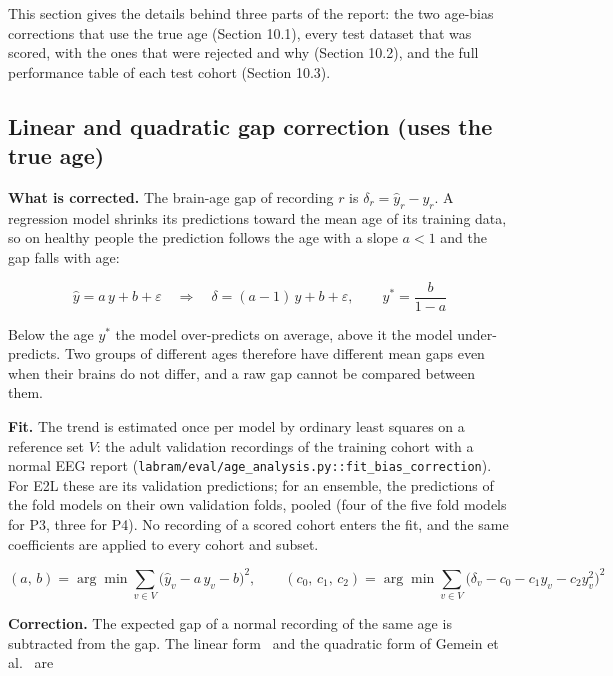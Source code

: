 \documentclass[11pt,a4paper]{article}
\begin{document}
This section gives the details behind three parts of the report: the two age-bias corrections that use the true age (Section 10.1), every test dataset that was scored, with the ones that were rejected and why (Section 10.2), and the full performance table of each test cohort (Section 10.3).

\subsection{Linear and quadratic gap correction (uses the true age)}

\textbf{What is corrected.} The brain-age gap of recording $r$ is $\delta_r = \hat y_r - y_r$. A regression model shrinks its predictions toward the mean age of its training data, so on healthy people the prediction follows the age with a slope $a < 1$ and the gap falls with age:

\begin{equation}
\hat y = a\,y + b + \varepsilon \quad \Rightarrow \quad \delta = (a - 1)\,y + b + \varepsilon, \qquad y^{*} = \frac{b}{1 - a} \tag{29}
\end{equation}

Below the age $y^{*}$ the model over-predicts on average, above it the model under-predicts. Two groups of different ages therefore have different mean gaps even when their brains do not differ, and a raw gap cannot be compared between them.

\textbf{Fit.} The trend is estimated once per model by ordinary least squares on a reference set $V$: the adult validation recordings of the training cohort with a normal EEG report (\texttt{labram/eval/age\_analysis.py::fit\_bias\_correction}). For E2L these are its validation predictions; for an ensemble, the predictions of the fold models on their own validation folds, pooled (four of the five fold models for P3, three for P4). No recording of a scored cohort enters the fit, and the same coefficients are applied to every cohort and subset.

\begin{equation}
(a,\,b) = \arg\min \sum_{v \in V} \big( \hat y_v - a\,y_v - b \big)^2, \qquad (c_0,\,c_1,\,c_2) = \arg\min \sum_{v \in V} \big( \delta_v - c_0 - c_1 y_v - c_2 y_v^2 \big)^2 \tag{30}
\end{equation}

\textbf{Correction.} The expected gap of a normal recording of the same age is subtracted from the gap. The linear form~\citep{beheshti2019bias,delange2020commentary} and the quadratic form of Gemein et al.~\citep{gemein2024revisited} are
\end{document}
